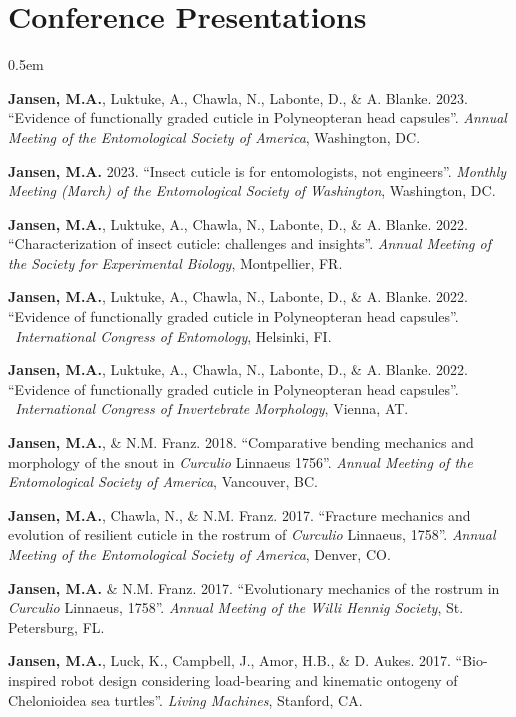 \documentclass[12pt,a4paper]{article}
\begin{document}
\section*{Conference Presentations}
	\begin{description}
		\itemsep0.5em
		\item \textbf{Jansen, M.A.}, Luktuke, A., Chawla, N., Labonte, D., \& A. Blanke. 2023. ``Evidence of functionally graded cuticle in Polyneopteran head capsules''. \textit{Annual Meeting of the Entomological Society of America}, Washington, DC.
		\item \textbf{Jansen, M.A.} 2023. ``Insect cuticle is for entomologists, not engineers''. \textit{Monthly Meeting (March) of the Entomological Society of Washington}, Washington, DC.
		\item \textbf{Jansen, M.A.}, Luktuke, A., Chawla, N., Labonte, D., \& A. Blanke. 2022. ``Characterization of insect cuticle: challenges and insights''. \textit{Annual Meeting of the Society for Experimental Biology}, Montpellier, FR.
		\item \textbf{Jansen, M.A.}, Luktuke, A., Chawla, N., Labonte, D., \& A. Blanke. 2022. ``Evidence of functionally graded cuticle	in Polyneopteran head capsules''. \textit{~International Congress of Entomology}, Helsinki, FI.
		\item \textbf{Jansen, M.A.}, Luktuke, A., Chawla, N., Labonte, D., \& A. Blanke. 2022. ``Evidence of functionally graded cuticle	in Polyneopteran head capsules''. \textit{~International Congress of Invertebrate Morphology}, Vienna, AT.
		\item \textbf{Jansen, M.A.}, \& N.M. Franz. 2018. ``Comparative bending mechanics and morphology of the snout in \textit{Curculio} Linnaeus 1756''. \textit{Annual Meeting of the Entomological Society of America}, Vancouver, BC.
		\item \textbf{Jansen, M.A.}, Chawla, N., \& N.M. Franz. 2017. ``Fracture mechanics and evolution of resilient cuticle in the rostrum of \textit{Curculio} Linnaeus, 1758''. \textit{Annual Meeting of the Entomological Society of America}, Denver, CO.
		\item \textbf{Jansen, M.A.} \& N.M. Franz. 2017. ``Evolutionary mechanics of the rostrum in \textit{Curculio} Linnaeus, 1758''. \textit{Annual Meeting of the Willi Hennig Society}, St. Petersburg, FL.
		\item \textbf{Jansen, M.A.}, Luck, K., Campbell, J., Amor, H.B., \& D. Aukes. 2017. ``Bio-inspired robot design considering load-bearing and kinematic ontogeny of Chelonioidea sea turtles''. \textit{Living Machines}, Stanford, CA.

\end{description}
\end{document}
